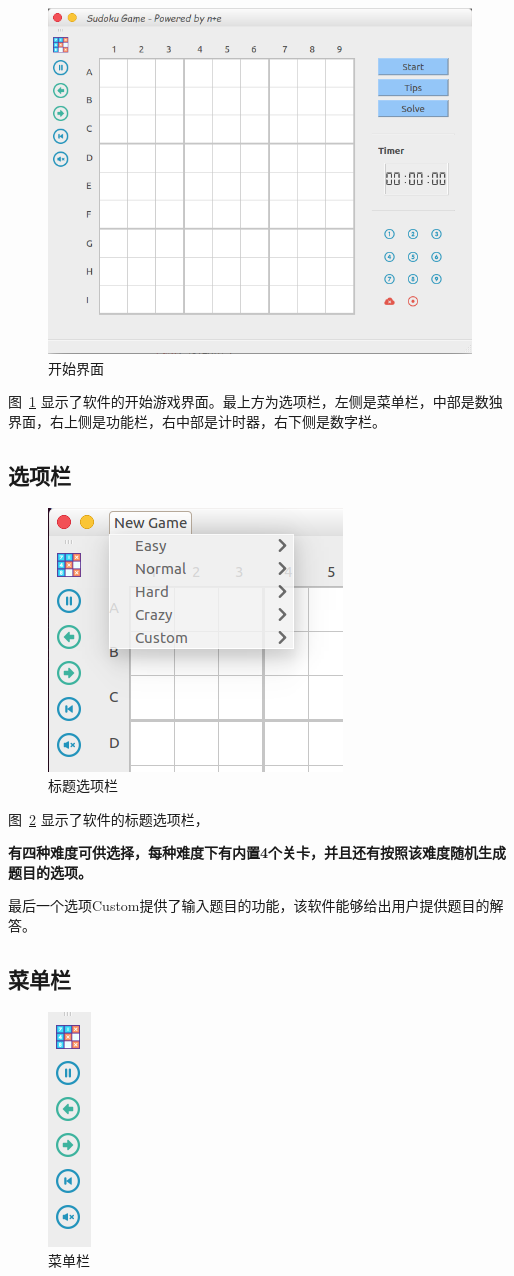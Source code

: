 \documentclass[a4paper]{article}
\begin{document}
\begin{figure}[htp]
\centering
\includegraphics[width=0.7\linewidth]{start.png}
\caption{开始界面}
\label{fig:start}
\end{figure}

图~\ref{fig:start} 显示了软件的开始游戏界面。最上方为选项栏，左侧是菜单栏，中部是数独界面，右上侧是功能栏，右中部是计时器，右下侧是数字栏。

\subsection{选项栏}
\begin{figure}[htp]
\centering
\includegraphics[width=0.5\linewidth]{title.png}
\caption{标题选项栏}
\label{fig:title}
\end{figure}

图~\ref{fig:title} 显示了软件的标题选项栏，{\bf 有四种难度可供选择，每种难度下有内置4个关卡，并且还有按照该难度随机生成题目的选项。

最后一个选项Custom提供了输入题目的功能，该软件能够给出用户提供题目的解答。}
\subsection{菜单栏}
\begin{figure}[htp]
\centering
\includegraphics[width=0.05\linewidth]{menubar.png}
\caption{菜单栏}
\label{fig:menu}
\end{figure}
\end{document}
